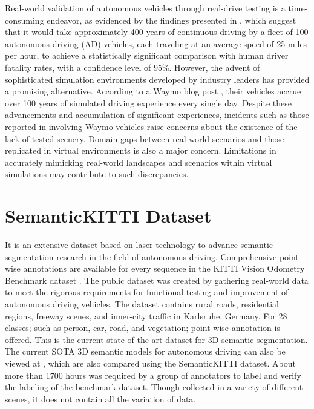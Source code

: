 Real-world validation of autonomous vehicles through real-drive testing is a time-consuming endeavor, as evidenced by the findings presented in \parencite{how_many_miles}, which suggest that it would take approximately 400 years of continuous driving by a fleet of 100 autonomous driving (AD) vehicles, each traveling at an average speed of 25 miles per hour, to achieve a statistically significant comparison with human driver fatality rates, with a confidence level of 95\%. However, the advent of sophisticated simulation environments developed by industry leaders has provided a promising alternative. According to a Waymo blog post \parencite{waymo_blog}, their vehicles accrue over 100 years of simulated driving experience every single day. Despite these advancements and accumulation of significant experiences, incidents such as those reported in \parencite{waymo_blog_accident} involving Waymo vehicles raise concerns about the existence of the lack of tested scenery. Domain gaps \parencite{zero_domain_gap} between real-world scenarios and those replicated in virtual environments is also a major concern. Limitations in accurately mimicking real-world landscapes and scenarios within virtual simulations may contribute to such discrepancies.


\section{SemanticKITTI Dataset}
It is an extensive dataset based on laser technology to advance semantic segmentation research in the field of autonomous driving. Comprehensive point-wise annotations are available for every sequence in the KITTI Vision Odometry Benchmark dataset \parencite{Geiger2012CVPR}. The public dataset was created by gathering real-world data to meet the rigorous requirements for functional testing and improvement of autonomous driving vehicles. The dataset contains rural roads, residential regions, freeway scenes, and inner-city traffic in Karlsruhe, Germany. For 28 classes; such as person, car, road, and vegetation; point-wise annotation is offered. This is the current state-of-the-art dataset for 3D semantic segmentation. The current SOTA 3D semantic models for autonomous driving can also be viewed at \parencite{papers-with-code}, which are also compared using the SemanticKITTI dataset. About more than 1700 hours \parencite{behley2019semantickitti} was required by a group of annotators to label and verify the labeling of the benchmark dataset. Though collected in a variety of different scenes, it does not contain all the variation of data.

